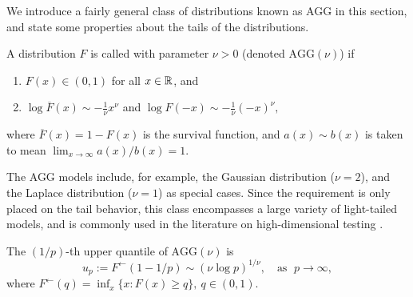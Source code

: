 
We introduce a fairly general class of distributions known as \ac{AGG} in this section, and state some properties about the tails of the 
 distributions.

\begin{definition} \label{def:AGG}
A distribution $F$ is called  
with parameter $\nu>0$ (denoted $\text{AGG}(\nu)$) if
\begin{enumerate}
    \item $F(x)\in(0,1)$ for all $x\in\mathbb R$, and \smallskip
    \item $\log{\overline{F}(x)} \sim -\frac{1}{\nu}x^\nu$ and $\log{F(-x)} \sim -\frac{1}{\nu}(-x)^\nu,$ \label{eq:AGG}
\end{enumerate}
where $\overline{F}(x) = 1 - F(x)$ is the survival function, and $a(x)\sim b(x)$ is taken to mean $\lim_{x\to\infty} a(x)/b(x) = 1$.
\end{definition}

The AGG models include, for example, the Gaussian distribution ($\nu = 2$), and the Laplace distribution ($\nu = 1$) as special cases. 
Since the requirement is only placed on the tail behavior, this class encompasses a large variety of light-tailed models, and is commonly used in the literature on high-dimensional testing \citep{cai2007estimation, arias2017distribution}.



\begin{proposition} \label{prop:quantile}
The $(1/p)$-th upper quantile of $\text{AGG}(\nu)$ is
\begin{equation} \label{eq:AGG-quantiles}
    u_{p} := F^\leftarrow(1-1/p) \sim \left(\nu\log{p}\right)^{1/\nu},\quad \text{as }\;p\to\infty,
\end{equation}
where $F^\leftarrow(q) = \inf_x\{x:F(x)\ge q\},\ q\in (0,1)$.
\end{proposition}


